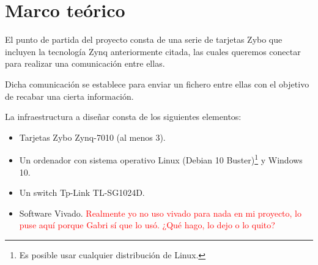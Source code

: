 \section{Marco teórico}
El punto de partida del proyecto consta de una serie de tarjetas Zybo que incluyen la tecnología Zynq anteriormente citada, las cuales queremos conectar para realizar una comunicación entre ellas.

Dicha comunicación se establece para enviar un fichero entre ellas con el objetivo de recabar una cierta información.

La infraestructura a diseñar consta de los siguientes elementos:
\begin{itemize}
	\item Tarjetas Zybo Zynq-7010 (al menos 3).
	\item Un ordenador con sistema operativo Linux (Debian 10 Buster)\footnote{Es posible usar cualquier distribución de Linux.} y Windows 10.
	\item Un switch Tp-Link TL-SG1024D.
	\item Software Vivado. \textcolor{red}{Realmente yo no uso vivado para nada en mi proyecto, lo puse aquí porque Gabri sí que lo usó. ¿Qué hago, lo dejo o lo quito?}
\end{itemize}